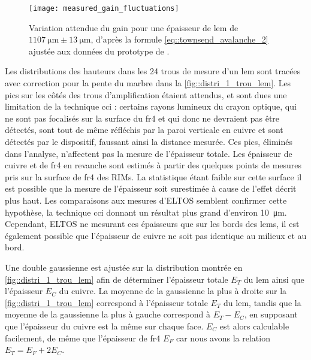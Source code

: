         \begin{figure}[htbp]
          \centering
          \texttt{[image: measured\_gain\_fluctuations]}
          \caption[Variation attendues du gain pour l'épaisseur moyennes des \glspl{lem} mesurés]{\label{fig::exp_gain_range}Variation attendue du gain pour une épaisseur de \gls{lem} de $\SI{1107}{\micro\meter}\pm\SI{13}{\micro\meter}$, d'après la formule \eqref{eq::townsend_avalanche_2} ajustée aux données du prototype de \threeL{}\cite{Cantini2014}.}
        \end{figure}
                
        Les distributions des hauteurs dans les 24 trous de mesure d'un \gls{lem} sont tracées avec correction pour la pente du marbre dans la \autoref{fig::distri_1_trou_lem}. Les pics sur les côtés des trous d'amplification étaient attendus, et sont dues une limitation de la technique \gls{cci} : certains rayons lumineux du crayon optique, qui ne sont pas focalisés sur la surface du \gls{fr4} et qui donc ne devraient pas être détectés, sont tout de même réfléchis par la paroi verticale en cuivre et sont détectés par le dispositif, faussant ainsi la distance mesurée. Ces pics, éliminés dans l'analyse, n'affectent pas la mesure de l'épaisseur totale. Les épaisseur de cuivre et de \gls{fr4} en revanche sont estimés à partir des quelques points de mesures pris sur la surface de \gls{fr4} des RIMs. La statistique étant faible sur cette surface il est possible que la mesure de l'épaisseur soit surestimée à cause de l'effet décrit plus haut. Les comparaisons aux mesures d'ELTOS semblent confirmer cette hypothèse, la technique \gls{cci} donnant un résultat plus grand d'environ \SI{10}{\micro\meter}. Cependant, ELTOS ne mesurant ces épaisseurs que sur les bords des \glspl{lem}, il est également possible que l'épaisseur de cuivre ne soit pas identique au milieux et au bord.
                
        Une double gaussienne est ajustée sur la distribution montrée en \autoref{fig::distri_1_trou_lem} afin de déterminer l'épaisseur totale $E_T$ du \gls{lem} ainsi que l'épaisseur $E_C$ du cuivre. La moyenne de la gaussienne la plus à droite sur la \autoref{fig::distri_1_trou_lem} correspond à l'épaisseur totale $E_T$ du \gls{lem}, tandis que la moyenne de la gaussienne la plus à gauche correspond à $E_T - E_C$, en supposant que l'épaisseur du cuivre est la même sur chaque face. $E_C$ est alors calculable facilement, de même que l'épaisseur de \gls{fr4} $E_F$ car nous avons la relation $E_T = E_F + 2E_C$.
                

